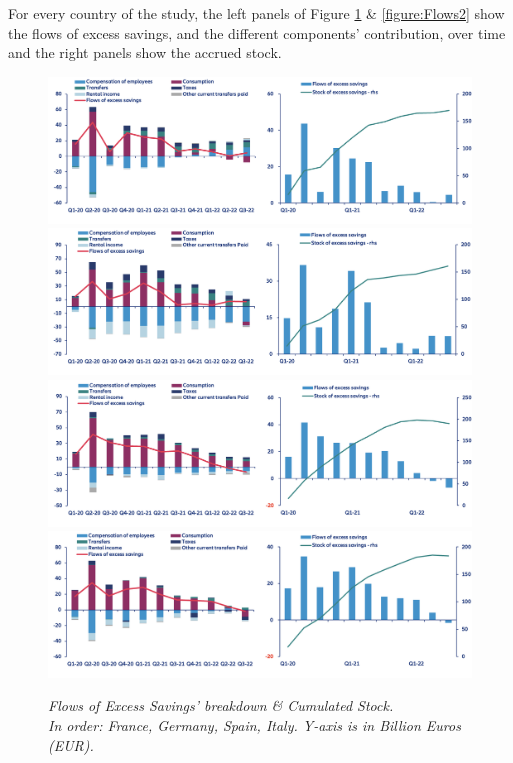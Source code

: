 For every country of the study, the left panels of Figure \ref{figure:Flows1} \& \ref{figure:Flows2} show the flows of excess savings, and the different components' contribution, over time and the right panels show the accrued stock.

\begin{figure}[H]
    \centering
    \caption{\textit{Flows of Excess Savings’ breakdown \& Cumulated Stock. \\ In order: France, Germany, Spain, Italy. Y-axis is in Billion Euros (EUR).}}
    \includegraphics[width=.9\textwidth]{Core/1.Savings/img/xFrance.png}
    \includegraphics[width=.9\textwidth]{Core/1.Savings/img/xGermany.png}
    \includegraphics[width=.9\textwidth]{Core/1.Savings/img/xSpain.png}
    \includegraphics[width=.9\textwidth]{Core/1.Savings/img/xItaly.png}
    \label{figure:Flows1}
\end{figure}

